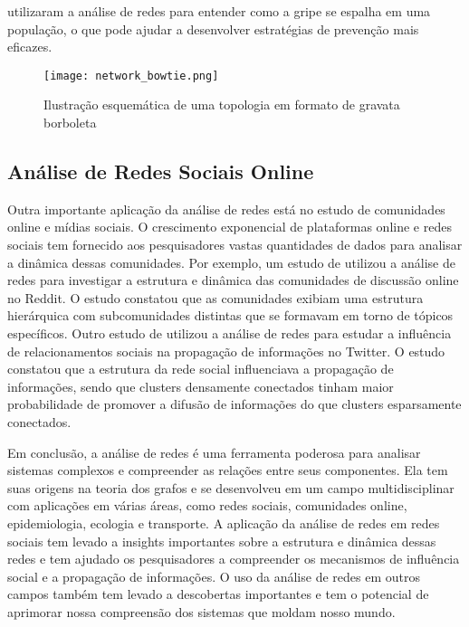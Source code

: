  utilizaram a análise de redes para entender como a gripe se espalha em uma população, o que pode ajudar a desenvolver estratégias de prevenção mais eficazes.
\begin{figure}[!htb]
    \caption{Ilustração esquemática de uma topologia em formato de gravata borboleta}
    \label{fig:network_bowtie}
    \centering
    \texttt{[image: network\_bowtie.png]}
\end{figure}

\subsection*{Análise de Redes Sociais Online}

Outra importante aplicação da análise de redes está no estudo de comunidades online e mídias sociais. O crescimento exponencial de plataformas online e redes sociais tem fornecido aos pesquisadores vastas quantidades de dados para analisar a dinâmica dessas comunidades. Por exemplo, um estudo de utilizou a análise de redes para investigar a estrutura e dinâmica das comunidades de discussão online no Reddit. O estudo constatou que as comunidades exibiam uma estrutura hierárquica com subcomunidades distintas que se formavam em torno de tópicos específicos. Outro estudo de  utilizou a análise de redes para estudar a influência de relacionamentos sociais na propagação de informações no Twitter. O estudo constatou que a estrutura da rede social influenciava a propagação de informações, sendo que clusters densamente conectados tinham maior probabilidade de promover a difusão de informações do que clusters esparsamente conectados.

Em conclusão, a análise de redes é uma ferramenta poderosa para analisar sistemas complexos e compreender as relações entre seus componentes. Ela tem suas origens na teoria dos grafos e se desenvolveu em um campo multidisciplinar com aplicações em várias áreas, como redes sociais, comunidades online, epidemiologia, ecologia e transporte. A aplicação da análise de redes em redes sociais tem levado a insights importantes sobre a estrutura e dinâmica dessas redes e tem ajudado os pesquisadores a compreender os mecanismos de influência social e a propagação de informações. O uso da análise de redes em outros campos também tem levado a descobertas importantes e tem o potencial de aprimorar nossa compreensão dos sistemas que moldam nosso mundo.

